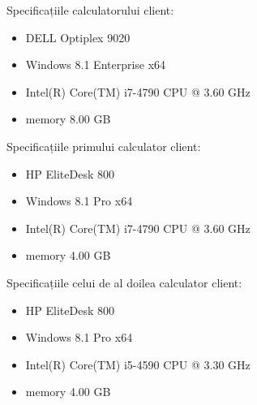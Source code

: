 Specificațiile calculatorului client:
\begin{itemize}
  \item DELL Optiplex 9020
  \item Windows 8.1 Enterprise x64
  \item Intel(R) Core(TM) i7-4790 CPU @ 3.60 GHz
  \item memory 8.00 GB
\end{itemize}

Specificațiile primului calculator client:
\begin{itemize}
  \item HP EliteDesk 800
  \item Windows 8.1 Pro x64
  \item Intel(R) Core(TM) i7-4790 CPU @ 3.60 GHz
  \item memory 4.00 GB
\end{itemize}

Specificațiile celui de al doilea calculator client:
\begin{itemize}
  \item HP EliteDesk 800
  \item Windows 8.1 Pro x64
  \item Intel(R) Core(TM) i5-4590 CPU @ 3.30 GHz
  \item memory 4.00 GB
\end{itemize}

